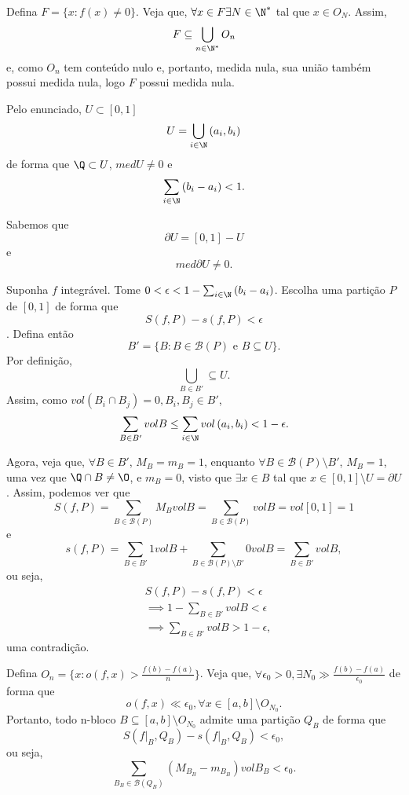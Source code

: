\documentclass[a4paper]{report}
\begin{document}
Defina $F = \{x : f\left( x \right) \neq 0\}$. Veja que, $\forall x \in F \exists N\in \N^{*}$ tal que $x\in O_N$. Assim, \[
F \subseteq \bigcup_{n\in \N^{*}} O_n
\] e, como $O_n$ tem conteúdo nulo e, portanto, medida nula, sua união também possui medida nula, logo $F$ possui medida nula.


Pelo enunciado, $U\subset \left[ 0,1 \right] $\[
U = \bigcup_{i\in \N} \left( a_i, b_i \right) 
\] de forma que $\Q \subset U$, $med U \neq 0$ e \[
\sum_{i\in \N} \left( b_i - a_i \right) < 1
.\] 

Sabemos que \[
\partial U = \left[ 0,1 \right] - U
\] e \[
med \partial U \neq 0
.\] 

Suponha $f$ integrável. Tome $0<\epsilon < 1-\sum_{i\in \N} \left( b_i - a_i \right) $. Escolha uma partição $P$ de $\left[ 0,1 \right] $ de forma que \[
S\left( f,P \right) - s\left( f,P \right) < \epsilon
\] . Defina então \[
B' = \{B : B\in \mathcal{B}\left( P \right) \text{ e } B \subseteq U\} 
.\] Por definição, \[
\bigcup_{B\in B'} \subseteq U
.\] Assim, como $vol\left( B_i\cap B_j \right) = 0, B_i, B_j \in B'$, \[
\sum_{B\in B'} vol B \le \sum_{i\in \N} vol\left( a_i, b_i \right) < 1- \epsilon
.\] 

Agora, veja que, $\forall B\in B'$, $M_B = m_B = 1$, enquanto $\forall B\in \mathcal{B}\left( P \right) \setminus B'$, $M_B = 1$, uma vez que $\Q\cap B \neq \O$, e $m_B=0$, visto que $\exists x\in B$ tal que $x\in \left[ 0,1 \right] \setminus U=\partial U$. Assim, podemos ver que \[
S\left( f,P \right) = \sum_{B\in \mathcal{B}\left( P \right) } M_B vol B = \sum_{B \in \mathcal{B}\left( P \right) } vol B = vol \left[ 0,1 \right] = 1
\] e \[
s\left( f,P \right) = \sum_{B \in B'} 1 vol B + \sum_{B\in \mathcal{B}\left( P \right) \setminus B'} 0 vol B = \sum_{B\in B'} vol B
,\] ou seja, 
\begin{align*}
& S\left( f,P \right)  - s\left( f,P \right) < \epsilon  \\
& \implies 1 - \sum_{B\in B'} vol B < \epsilon \\
& \implies \sum_{B\in B'} vol B > 1 - \epsilon
,\end{align*}
uma contradição.


Defina $O_n = \{x : o\left( f, x \right) > \frac{f\left( b \right) -f\left( a \right) }{n}\} $. Veja que, $\forall \epsilon_0 > 0, \exists N_0\gg\frac{f\left( b \right) -f\left( a \right) }{\epsilon_0}$ de forma que \[
o\left( f, x \right) \ll \epsilon_0, \forall x \in \left[ a,b \right] \setminus O_{N_0}
.\] Portanto, todo n-bloco $B \subseteq \left[ a,b \right] \setminus O_{N_0}$ admite uma partição $Q_B$ de forma que \[
S\left( f|_B,Q_B \right) - s\left( f|_B, Q_B \right) < \epsilon_0
,\] ou seja, \[
\sum_{B_B \in \mathcal{B}\left( Q_B \right) } \left( M_{B_B}-m_{B_B} \right) vol B_B < \epsilon_0
.\] 
\end{document}
